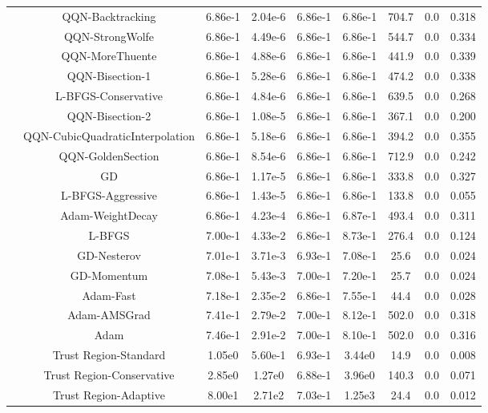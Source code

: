 {\begin{longtable}{l*{8}{S[table-format=2.2e-1]}}
 & QQN-Backtracking & 6.86e-1 & 2.04e-6 & 6.86e-1 & 6.86e-1 & 704.7 & 0.0 & 0.318 \\
 & QQN-StrongWolfe & 6.86e-1 & 4.49e-6 & 6.86e-1 & 6.86e-1 & 544.7 & 0.0 & 0.334 \\
 & QQN-MoreThuente & 6.86e-1 & 4.88e-6 & 6.86e-1 & 6.86e-1 & 441.9 & 0.0 & 0.339 \\
 & QQN-Bisection-1 & 6.86e-1 & 5.28e-6 & 6.86e-1 & 6.86e-1 & 474.2 & 0.0 & 0.338 \\
 & L-BFGS-Conservative & 6.86e-1 & 4.84e-6 & 6.86e-1 & 6.86e-1 & 639.5 & 0.0 & 0.268 \\
 & QQN-Bisection-2 & 6.86e-1 & 1.08e-5 & 6.86e-1 & 6.86e-1 & 367.1 & 0.0 & 0.200 \\
 & QQN-CubicQuadraticInterpolation & 6.86e-1 & 5.18e-6 & 6.86e-1 & 6.86e-1 & 394.2 & 0.0 & 0.355 \\
 & QQN-GoldenSection & 6.86e-1 & 8.54e-6 & 6.86e-1 & 6.86e-1 & 712.9 & 0.0 & 0.242 \\
 & GD & 6.86e-1 & 1.17e-5 & 6.86e-1 & 6.86e-1 & 333.8 & 0.0 & 0.327 \\
 & L-BFGS-Aggressive & 6.86e-1 & 1.43e-5 & 6.86e-1 & 6.86e-1 & 133.8 & 0.0 & 0.055 \\
 & Adam-WeightDecay & 6.86e-1 & 4.23e-4 & 6.86e-1 & 6.87e-1 & 493.4 & 0.0 & 0.311 \\
 & L-BFGS & 7.00e-1 & 4.33e-2 & 6.86e-1 & 8.73e-1 & 276.4 & 0.0 & 0.124 \\
 & GD-Nesterov & 7.01e-1 & 3.71e-3 & 6.93e-1 & 7.08e-1 & 25.6 & 0.0 & 0.024 \\
 & GD-Momentum & 7.08e-1 & 5.43e-3 & 7.00e-1 & 7.20e-1 & 25.7 & 0.0 & 0.024 \\
 & Adam-Fast & 7.18e-1 & 2.35e-2 & 6.86e-1 & 7.55e-1 & 44.4 & 0.0 & 0.028 \\
 & Adam-AMSGrad & 7.41e-1 & 2.79e-2 & 7.00e-1 & 8.12e-1 & 502.0 & 0.0 & 0.318 \\
 & Adam & 7.46e-1 & 2.91e-2 & 7.00e-1 & 8.10e-1 & 502.0 & 0.0 & 0.316 \\
 & Trust Region-Standard & 1.05e0 & 5.60e-1 & 6.93e-1 & 3.44e0 & 14.9 & 0.0 & 0.008 \\
 & Trust Region-Conservative & 2.85e0 & 1.27e0 & 6.88e-1 & 3.96e0 & 140.3 & 0.0 & 0.071 \\
 & Trust Region-Adaptive & 8.00e1 & 2.71e2 & 7.03e-1 & 1.25e3 & 24.4 & 0.0 & 0.012 \\
\midrule
\end{longtable}
}

